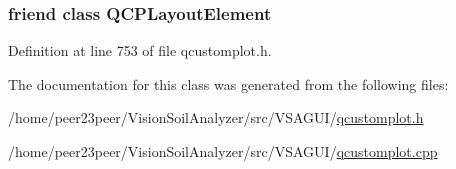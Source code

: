 \subsubsection[{Q\+C\+P\+Layout\+Element}]{\setlength{\rightskip}{0pt plus 5cm}friend class {\bf Q\+C\+P\+Layout\+Element}\hspace{0.3cm}{\ttfamily [friend]}}\label{class_q_c_p_layout_a0790750c7e7f14fdbd960d172655b42b}


Definition at line 753 of file qcustomplot.\+h.



The documentation for this class was generated from the following files\+:\begin{DoxyCompactItemize}
\item 
/home/peer23peer/\+Vision\+Soil\+Analyzer/src/\+V\+S\+A\+G\+U\+I/\hyperlink{qcustomplot_8h}{qcustomplot.\+h}\item 
/home/peer23peer/\+Vision\+Soil\+Analyzer/src/\+V\+S\+A\+G\+U\+I/\hyperlink{qcustomplot_8cpp}{qcustomplot.\+cpp}\end{DoxyCompactItemize}
